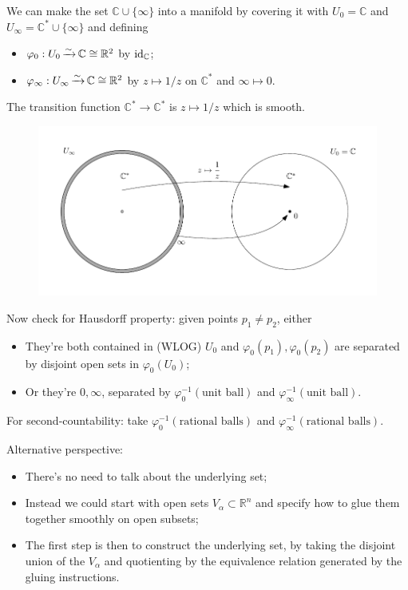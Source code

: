 \documentclass[a4paper,11pt]{article}
\begin{document}
	\begin{ex}
		We can make the set $\mathbb{C}\cup \{\infty\}$ into a manifold by covering it with $U_0 = \mathbb{C}$ and $U_\infty = \mathbb{C}^* \cup \{\infty\}$ and defining
		\begin{itemize}
			\item $\varphi_0 : U_0 \operatorname{\xrightarrow{\sim}} \mathbb{C} \cong \mathbb{R}^2$ by $\operatorname{id}_{\mathbb{C}}$;
			\item $\varphi_{\infty}: U_\infty \operatorname{\xrightarrow{\sim}} \mathbb{C} \cong \mathbb{R}^2$ by $z \mapsto 1/z$ on $\mathbb{C}^*$ and $\infty \mapsto 0$. 
		\end{itemize}
		The transition function $\mathbb{C}^* \to \mathbb{C}^*$ is $z \mapsto 1/z$ which is smooth.

		\begin{figure}[H]
			\centering
			\includegraphics[width=\linewidth]{fig/fig4.pdf}
		\end{figure}

		Now check for Hausdorff property: given points $p_1 \neq p_2$, either
		\begin{itemize}
			\item They're both contained in (WLOG) $U_0$ and $\varphi_0 (p_1), \varphi_0(p_2)$ are separated by disjoint open sets in $\varphi_0 (U_0)$;
			\item Or they're $0, \infty$, separated by $\varphi_0^{-1}(\text{unit ball})$ and $\varphi_\infty^{-1}(\text{unit ball})$.
		\end{itemize}

		For second-countability: take $\varphi_0^{-1}(\text{rational balls})$ and $\varphi_\infty^{-1}(\text{rational balls})$.
	\end{ex}

	Alternative perspective:
	\begin{itemize}
		\item There's no need to talk about the underlying set;
		\item Instead we could start with open sets $V_\alpha \subset \mathbb{R}^n$ and specify how to glue them together smoothly on open subsets;
		\item The first step is then to construct the underlying set, by taking the disjoint union of the $V_\alpha$ and quotienting by the equivalence relation generated by the gluing instructions.
	\end{itemize}
\end{document}
